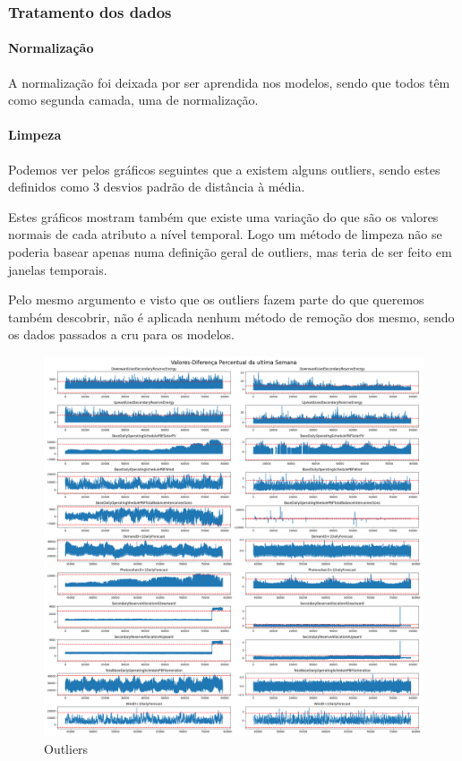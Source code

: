 


\subsubsection{Tratamento dos dados}

\paragraph{Normalização} \par
\text{ }  \par

A normalização foi deixada por ser aprendida nos modelos, sendo que todos têm como segunda camada, uma de normalização.\par

\paragraph{Limpeza} \par
\text{ }  \par

Podemos ver pelos gráficos seguintes que a existem alguns outliers, sendo estes definidos como 3 desvios padrão de distância à média.\par
Estes gráficos mostram também que existe uma variação do que são os valores normais de cada atributo a nível temporal. Logo um método de limpeza não se poderia basear apenas numa definição geral de outliers, mas teria de ser feito em janelas temporais.\par
Pelo mesmo argumento e visto que os outliers fazem parte do que queremos também descobrir, não é aplicada nenhum método de remoção dos mesmo, sendo os dados passados a cru para os modelos.\par


\begin{figure}[H]
  \centering
  \includegraphics[width=\textwidth]{plots/Outliers_3stds.png}
  \caption{Outliers}
\end{figure}

